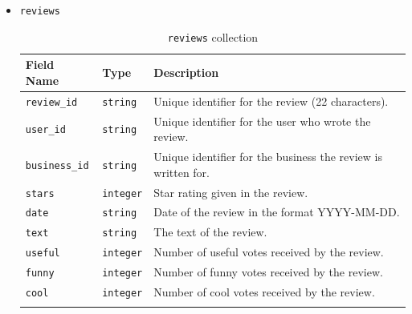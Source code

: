 \documentclass{Configuration_Files/PoliMi3i_thesis}
\begin{document}
\begin{itemize}
\item{\texttt{reviews}}
\begin{longtable}{|p{3cm}|p{2.5cm}|p{10cm}|}
\hline
\textbf{Field Name} & \textbf{Type} & \textbf{Description} \\ \hline
\texttt{review\_id} & \texttt{string} & Unique identifier for the review (22 characters). \\ \hline
\texttt{user\_id} & \texttt{string} & Unique identifier for the user who wrote the review. \\ \hline
\texttt{business\_id} & \texttt{string} & Unique identifier for the business the review is written for. \\ \hline
\texttt{stars} & \texttt{integer} & Star rating given in the review. \\ \hline
\texttt{date} & \texttt{string} & Date of the review in the format YYYY-MM-DD. \\ \hline
\texttt{text} & \texttt{string} & The text of the review. \\ \hline
\texttt{useful} & \texttt{integer} & Number of useful votes received by the review. \\ \hline
\texttt{funny} & \texttt{integer} & Number of funny votes received by the review. \\ \hline
\texttt{cool} & \texttt{integer} & Number of cool votes received by the review. \\ \hline
\caption{\texttt{reviews} collection}
\end{longtable}


\end{itemize}
\end{document}
